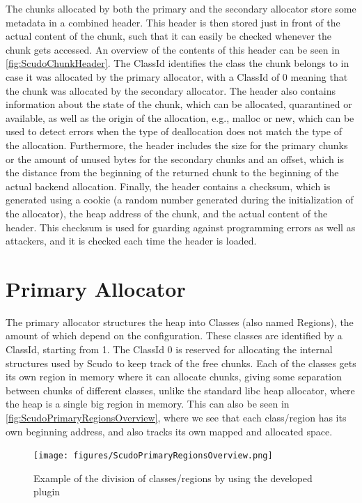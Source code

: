\documentclass[a4paper,11pt,oneside]{report}
\begin{document}
The chunks allocated by both the primary and the secondary allocator store some
metadata in a combined header. This header is then stored just in front of the
actual content of the chunk, such that it can easily be checked whenever the
chunk gets accessed. An overview of the contents of this header can be seen
in \autoref{fig:ScudoChunkHeader}. The ClassId identifies the class the chunk
belongs to in case it was allocated by the primary allocator, with a ClassId
of 0 meaning that the chunk was allocated by the secondary allocator. The
header also contains information about the state of the chunk, which can be
allocated, quarantined or available, as well as the origin of the allocation,
e.g., malloc or new, which can be used to detect errors when the type of
deallocation does not match the type of the allocation. Furthermore, the
header includes the size for the primary chunks or the amount of unused bytes
for the secondary chunks and an offset, which is the distance from the beginning
of the returned chunk to the beginning of the actual backend allocation.
Finally, the header contains a checksum, which is generated using a cookie (a
random number generated during the initialization of the allocator), the heap
address of the chunk, and the actual content of the header. This checksum is
used for guarding against programming errors as well as attackers, and it is
checked each time the header is loaded.

\section{Primary Allocator}

The primary allocator structures the heap into Classes (also named Regions), the
amount of which depend on the configuration. These classes are identified by a
ClassId, starting from 1. The ClassId 0 is reserved for allocating the internal
structures used by Scudo to keep track of the free chunks.
Each of the classes gets its own region in memory where it can allocate chunks,
giving some separation between chunks of different classes, unlike the standard
libc heap allocator, where the heap is a single big region in memory. This can
also be seen in \autoref{fig:ScudoPrimaryRegionsOverview}, where we see that
each class/region has its own beginning address, and also tracks its own mapped
and allocated space.

\begin{figure}[h!]
  \centering
  \texttt{[image: figures/ScudoPrimaryRegionsOverview.png]}
  \caption{Example of the division of classes/regions by using the developed plugin}
  \label{fig:ScudoPrimaryRegionsOverview}
\end{figure}
\end{document}
